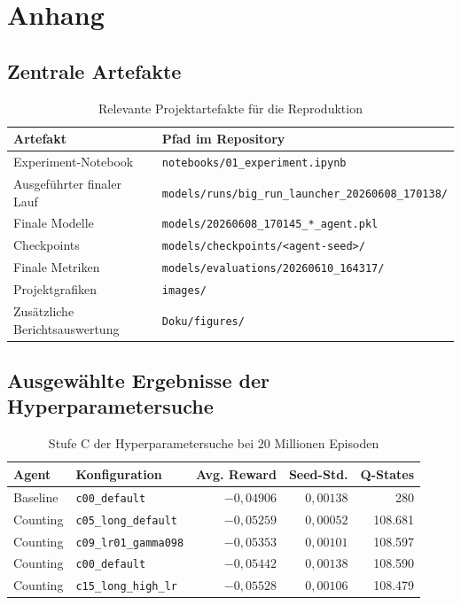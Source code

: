 \appendix
\section{Anhang}
\label{sec:anhang}

\subsection{Zentrale Artefakte}

\begin{table}[H]
  \centering
  \caption{Relevante Projektartefakte für die Reproduktion}
  \small
  \begin{tabularx}{\textwidth}{lX}
    \toprule
    \textbf{Artefakt} & \textbf{Pfad im Repository}\\
    \midrule
    Experiment-Notebook & \texttt{notebooks/01\_experiment.ipynb}\\
    Ausgeführter finaler Lauf &
    \texttt{models/runs/big\_run\_launcher\_20260608\_170138/}\\
    Finale Modelle & \texttt{models/20260608\_170145\_*\_agent.pkl}\\
    Checkpoints & \texttt{models/checkpoints/<agent-seed>/}\\
    Finale Metriken & \texttt{models/evaluations/20260610\_164317/}\\
    Projektgrafiken & \texttt{images/}\\
    Zusätzliche Berichtsauswertung & \texttt{Doku/figures/}\\
    \bottomrule
  \end{tabularx}
\end{table}

\subsection{Ausgewählte Ergebnisse der Hyperparametersuche}

\begin{table}[H]
  \centering
  \caption{Stufe C der Hyperparametersuche bei 20 Millionen Episoden}
  \small
  \begin{tabular}{llrrr}
    \toprule
    \textbf{Agent} & \textbf{Konfiguration} & \textbf{Avg. Reward} &
    \textbf{Seed-Std.} & \textbf{Q-States}\\
    \midrule
    Baseline & \texttt{c00\_default} & $-0{,}04906$ & $0{,}00138$ & 280\\
    Counting & \texttt{c05\_long\_default} & $-0{,}05259$ &
    $0{,}00052$ & 108.681\\
    Counting & \texttt{c09\_lr01\_gamma098} & $-0{,}05353$ &
    $0{,}00101$ & 108.597\\
    Counting & \texttt{c00\_default} & $-0{,}05442$ & $0{,}00138$ & 108.590\\
    Counting & \texttt{c15\_long\_high\_lr} & $-0{,}05528$ &
    $0{,}00106$ & 108.479\\
    \bottomrule
  \end{tabular}
\end{table}

